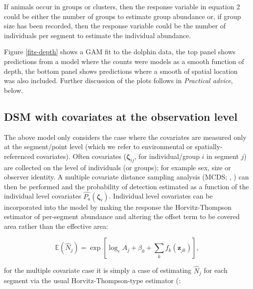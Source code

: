 \documentclass[a4paper,12pt]{article}
\begin{document}
If animals occur in groups or clusters, then the response variable in equation 2 could be either the number of groups to estimate group abundance or, if group size has been recorded, then the response variable could be the number of individuals per segment to estimate the individual abundance.


Figure \ref{fits-depth} shows a GAM fit to the dolphin data, the top panel shows predictions from a model where the counts were models as a smooth function of depth, the bottom panel shows predictions where a smooth of spatial location was also included. Further discussion of the plots follows in \textit{Practical advice}, below.

\subsection*{DSM with covariates at the observation level}

The above model only considers the case where the covariates are measured only at the segment/point level (which we refer to environmental or spatially-referenced covariates). Often covariates ($\bm{\zeta}_{ij}$, for individual/group $i$ in segment $j$) are collected on the level of individuals (or groups); for example sex, size or observer identity. A multiple covariate distance sampling analysis (MCDS; \cite{Marques:2003vb}, \cite{Marques:2007vm}) can then be performed and the probability of detection estimated as a function of the individual level covariates $\hat{P_a}(\bm{\zeta}_i)$. Individual level covariates can be incorporated into the model by making the response the Horvitz-Thompson estimator of per-segment abundance and altering the offset term to be covered area rather than the effective area:

\begin{equation}
\mathbb{E}(\hat{N}_j) = \exp\left[ \log_e A_j + \beta_0 + \sum_k f_k\left(\bm{z}_{jk}\right) \right],
\label{e:gamN}
\end{equation}

for the multiple covariate case it is simply a case of estimating $\hat{N}_j$ for each segment via the usual Horvitz-Thompson-type estimator (\cite{Thompson:2002wi}:
\end{document}
